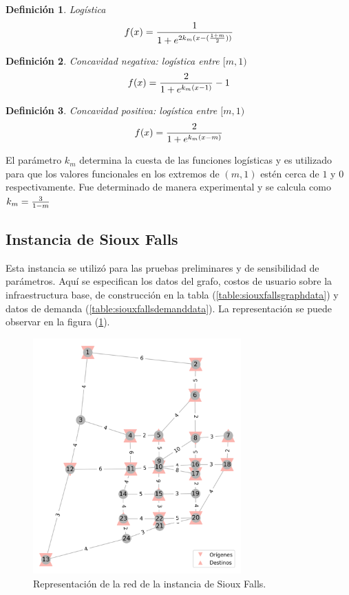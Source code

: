 \documentclass{article}
\newtheorem{definition}{Definición}
\begin{document}
  \begin{definition}
    Logística
    \begin{align}
        f(x) = {1 \over 1 + e^{2k_m(x - ({1 + m \over 2}))}}
    \end{align}
  \end{definition}

  \begin{definition}
    Concavidad negativa: logística entre $[m, 1)$
    \begin{align}
        f(x) = {2 \over 1 + e^{k_m(x - 1)}} - 1
    \end{align}
  \end{definition}

  \begin{definition}
    Concavidad positiva: logística entre $[m, 1)$
    \begin{align}
        f(x) = {2 \over 1 + e^{k_m(x - m)}}
    \end{align}
  \end{definition}

  El parámetro $k_m$ determina la cuesta de las funciones logísticas y es utilizado para que los valores funcionales en los extremos de $(m, 1)$ estén cerca de $1$ y $0$ respectivamente. Fue determinado de manera experimental y se calcula como $k_m = {3 \over 1 - m}$

  \subsection{Instancia de Sioux Falls}

  Esta instancia se utilizó para las pruebas preliminares y de sensibilidad de parámetros. Aquí se especifican los datos del grafo, costos de usuario sobre la infraestructura base, de construcción en la tabla (\ref{table:siouxfallsgraphdata}) y datos de demanda (\ref{table:siouxfallsdemanddata}). La representación se puede observar en la figura (\ref{fig:siouxfallsapendix}).

  \begin{figure}[h!]
    \centering
    \includegraphics[width=8cm]{../resources/sioux_falls_odpairs.png}
    \caption{Representación de la red de la instancia de Sioux Falls.}
    \label{fig:siouxfallsapendix}
  \end{figure}
\end{document}
